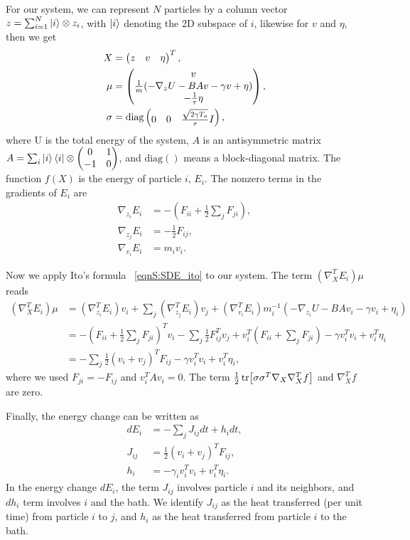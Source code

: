 \documentclass[
 amsmath,amssymb,
 aps,
 pre,
 longbibliography,
 10pt, onecolumn,
 notitlepage
]{revtex4-1}
\begin{document}
For our system, we can represent $N$ particles by a column vector $z = \sum_{i=1}^N \ket{i}\otimes z_i$, with $\ket{i}$ denoting the 2D subspace of $i$, likewise for $v$ and $\eta$, then we get
\begin{align}
X &= \pmqty{ z & v & \eta }^T, \label{eqnS:SDE_X}\\
\mu &= \pmqty{ v \\
\frac{1}{m}(-\nabla_zU - BAv - \gamma v + \eta) \\
-\frac{1}{\tau}\eta }, \label{eqnS:SDE_mu} \\
\sigma &= \text{diag} \pmqty{0 & 0 & \frac{\sqrt{2\gamma T_a}}{\tau} I}, \label{eqnS:SDE_sigma}
\end{align}
where U is the total energy of the system, $A$ is an antisymmetric matrix $A=\sum_i \ket{i}\bra{i}\otimes \mqty(0 & 1 \\ -1 & 0)$, and $\text{diag}()$ means a block-diagonal matrix.
The function $f(X)$ is the energy of particle $i$, $E_i$.
The nonzero terms in the gradients of $E_i$ are
\begin{align}
\nabla_{z_i}E_i &= -(F_{ii} + \frac{1}{2}\sum_jF_{ji}), \\
\nabla_{z_j}E_i &= -\frac{1}{2}F_{ij}, \\
\nabla_{v_i}E_i &= m_iv_i.
\end{align}

Now we apply Ito's formula \eqnname~\eqref{eqnS:SDE_ito} to our system.
The term $(\nabla_X^TE_i)\mu$ reads
\begin{equation}
\begin{split}
(\nabla_X^TE_i)\mu
&= (\nabla_{z_i}^TE_i)v_i + \sum_j(\nabla_{z_j}^TE_i)v_j + (\nabla_{v_i}^TE_i)m_i^{-1}(-\nabla_{z_i}U - BAv_i - \gamma v_i + \eta_i) \\
&= -(F_{ii} + \frac{1}{2}\sum_jF_{ji})^T v_i - \sum_j\frac{1}{2}F_{ij}^T v_j + v_i^T (F_{ii} + \sum_jF_{ji}) - \gamma v_i^Tv_i + v_i^T\eta_i \\
&= -\sum_j\frac{1}{2}(v_i + v_j)^T F_{ij} - \gamma v_i^Tv_i + v_i^T\eta_i ,
\end{split}
\end{equation}
where we used $F_{ji} = -F_{ij}$ and $v_i^TAv_i = 0$.
The term $\frac{1}{2}\tr[\sigma \sigma^T \nabla_X\nabla_X^Tf]$ and $\nabla_X^Tf$ are zero.

Finally, the energy change can be written as
\begin{align}
dE_i &= -\sum_jJ_{ij}dt + h_i dt, \label{eqnS:flux_dEi} \\
J_{ij} &= \frac{1}{2}(v_i + v_j)^T F_{ij}, \label{eqnS:flux_Jij} \\
h_i &= -\gamma_i v_i^Tv_i +v_i^T\eta_i. \label{eqnS:flux_hi}
\end{align}
In the energy change $dE_i$, the term $J_{ij}$ involves particle $i$ and its neighbors, and $dh_i$ term involves $i$ and the bath. We identify $J_{ij}$ as the heat transferred (per unit time) from particle $i$ to $j$, and $h_i$ as the heat transferred from particle $i$ to the bath.
\end{document}
